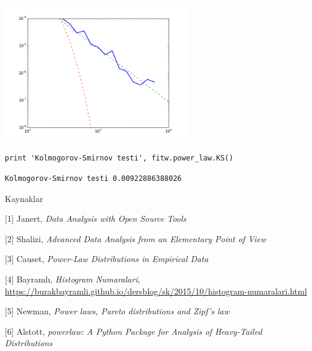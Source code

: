 \documentclass[12pt,fleqn]{article}\usepackage{../../common}
\begin{document}
\includegraphics[height=6cm]{stat_powerlaw_01.png}

\begin{verbatim}
print 'Kolmogorov-Smirnov testi', fitw.power_law.KS()
\end{verbatim}

\begin{verbatim}
Kolmogorov-Smirnov testi 0.00922886388026
\end{verbatim}

Kaynaklar

[1] Janert, {\em Data Analysis with Open Source Tools}

[2] Shalizi, {\em Advanced Data Analysis from an Elementary Point of View}

[3] Causet, {\em Power-Law Distributions in Empirical Data}

[4] Bayramlı, 
    {\em Histogram Numaralari}, 
    \url{https://burakbayramli.github.io/dersblog/sk/2015/10/histogram-numaralari.html}

[5] Newman, {\em Power laws, Pareto distributions and Zipf's law}

[6] Alstott, {\em powerlaw: A Python Package for Analysis of Heavy-Tailed Distributions}
\end{document}
